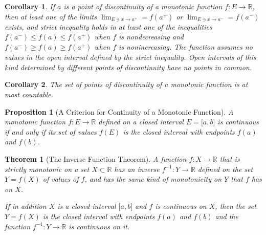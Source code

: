 \documentclass[onecolumn]{ctexart}
\newtheorem{theorem}{Theorem}
\newtheorem{proposition}{Proposition}
\newtheorem{corollary}{Corollary}
\begin{document}
\begin{corollary}
  If $a$ is a point of discontinuity of a monotonic function $f:E \to \mathbb{R}$, 
  then at least one of the limits $\lim_{E \owns x \to a^+} = f(a^+)$ or 
  $\lim_{E \owns x \to a^-} = f(a^-)$ exists, and strict inequality holds in at 
  least one of the inequalities $f(a^-) \leq f(a) \leq f(a^+)$ when $f$ is 
  nondecreasing and $f(a^-) \geq f(a) \geq f(a^+)$ when $f$ is nonincreasing. 
  The function assumes no values in the open interval defined by the strict 
  inequality. Open intervals of this kind determined by different points of 
  discontinuity have no points in common.
\end{corollary}

\begin{corollary}
  The set of points of discontinuity of a monotonic function is at most 
  countable.
\end{corollary}

\begin{proposition}[A Criterion for Continuity of a Monotonic Function]
  A monotonic function $f:E \to \mathbb{R}$ defined on a closed interval 
  $E = \lbrack a,b \rbrack$ is continuous if and only if its set of values 
  $f(E)$ is the closed interval with endpoints $f(a)$ and $f(b)$.
\end{proposition}

\begin{theorem}[The Inverse Function Theorem]
  A function $f:X \to \mathbb{R}$ that is strictly monotonic on a set $X \subset 
  \mathbb{R}$ has an inverse $f^{-1}: Y \to \mathbb{R}$ defined on the set $Y = 
  f(X)$ of values of $f$, and has the same kind of monotonicity on $Y$ that $f$ 
  has on $X$.

  If in addition $X$ is a closed interval $\lbrack a,b \rbrack$ and $f$ is 
  continuous on $X$, then the set $Y = f(X)$ is the closed interval with 
  endpoints $f(a)$ and $f(b)$ and the function $f^{-1}: Y \to \mathbb{R}$ is 
  continuous on it.
\end{theorem}
\end{document}
